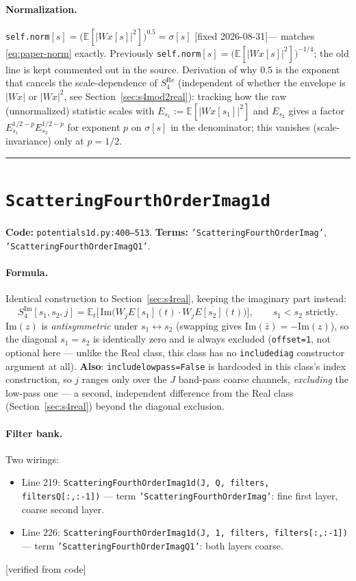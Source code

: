 \documentclass[11pt]{article}
\newcommand{\E}{\mathbb{E}}
\newcommand{\Wx}{W\!x}
\newcommand{\code}[1]{\texttt{#1}}
\renewcommand{\_}{\origunderscore\allowbreak} %
\newcommand{\verified}{\textcolor{blue!50!black}{[verified from code]}}
\newcommand{\fixed}{\textcolor{green!40!black}{[fixed 2026-08-31]}}
\begin{document}
\paragraph{Normalization.} \code{self.norm}$[s] = \big(\E[|\Wx[s]|^2]\big)^{0.5} = \sigma[s]$
\fixed — matches \eqref{eq:paper-norm} exactly. Previously
\code{self.norm}$[s]=\big(\E[|\Wx[s]|^2]\big)^{-1/4}$; the old line is kept
commented out in the source. Derivation of why $0.5$ is the exponent that
cancels the scale-dependence of $S_4^{\text{Re}}$ (independent of whether the
envelope is $|\Wx|$ or $|\Wx|^2$, see Section~\ref{sec:s4mod2real}): tracking how
the raw (unnormalized) statistic scales with $E_{s_1}:=\E[|\Wx[s_1]|^2]$ and
$E_{s_2}$ gives a factor $E_{s_1}^{1/2-p}E_{s_2}^{1/2-p}$ for exponent $p$ on
$\sigma[s]$ in the denominator; this vanishes (scale-invariance) only at $p=1/2$.

\bigskip
\hrule
\bigskip

\section{\code{Scattering\_Fourth\_Order\_Imag\_1d}}
\textbf{Code:} \code{potentials\_1d.py:400--513}. \quad
\textbf{Terms:} \code{'Scattering\_Fourth\_Order\_Imag'}, \code{'Scattering\_Fourth\_Order\_Imag\_Q1'}.

\paragraph{Formula.} Identical construction to Section~\ref{sec:s4real}, keeping
the imaginary part instead:
\begin{equation}
  S_4^{\text{Im}}[s_1,s_2,j] = \E_t\Big[\,\mathrm{Im}\big(W_j E[s_1](t)\cdot \overline{W_j E[s_2](t)}\big)\Big], \qquad s_1 < s_2 \text{ strictly}.
\end{equation}
$\mathrm{Im}(z)$ is \emph{antisymmetric} under $s_1\!\leftrightarrow\!s_2$
(swapping gives $\mathrm{Im}(\bar z)=-\mathrm{Im}(z)$), so the diagonal
$s_1=s_2$ is identically zero and is always excluded (\code{offset=1}, not
optional here — unlike the Real class, this class has no \code{include\_diag}
constructor argument at all). \textbf{Also}: \code{include\_lowpass=False} is
hardcoded in this class's index construction, so $j$ ranges only over the $J$
band-pass coarse channels, \emph{excluding} the low-pass one — a second,
independent difference from the Real class (Section~\ref{sec:s4real}) beyond
the diagonal exclusion.

\paragraph{Filter bank.} Two wirings:
\begin{itemize}
  \item Line 219: \code{Scattering\_Fourth\_Order\_Imag\_1d(J, Q, filters, filters\_Q[:,:-1])}
        — term \code{'Scattering\_Fourth\_Order\_Imag'}: fine first layer, coarse second layer.
  \item Line 226: \code{Scattering\_Fourth\_Order\_Imag\_1d(J, 1, filters, filters[:,:-1])}
        — term \code{'Scattering\_Fourth\_Order\_Imag\_Q1'}: both layers coarse.
\end{itemize}
\verified
\end{document}

